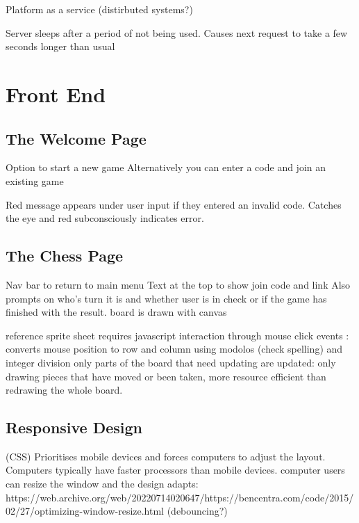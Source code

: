 Platform as a service (distirbuted systems?)

Server sleeps after a period of not being used. Causes next request to take a few seconds longer than usual


\section{Front End}

\subsection{The Welcome Page}

Option to start a new game\linebreak
Alternatively you can enter a code and join an existing game

Red message appears under user input if they entered an invalid code. Catches the eye and red subconsciously indicates error.

\subsection{The Chess Page}

Nav bar to return to main menu\linebreak
Text at the top to show join code and link\linebreak
Also prompts on who's turn it is and whether user is in check or if the game has finished with the result.\linebreak
board is drawn with canvas

reference sprite sheet\linebreak
requires javascript\linebreak
interaction through mouse click events : converts mouse position to row and column using modolos (check spelling) and integer division\linebreak
only parts of the board that need updating are updated: only drawing pieces that have moved or been taken, more resource efficient than redrawing the whole board.

\subsection{Responsive Design}

(CSS) Prioritises mobile devices and forces computers to adjust the layout. Computers typically have faster processors than mobile devices.\linebreak
computer users can resize the window and the design adapts: https://web.archive.org/web/20220714020647/https://bencentra.com/code/2015/02/27/optimizing-window-resize.html (debouncing?)